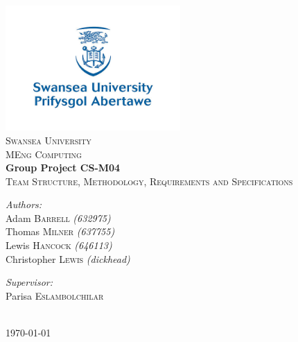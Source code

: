 \begin{titlepage}

\begin{center}
\includegraphics[width=0.5\textwidth]{img/University_Logo}\\

\textsc{\LARGE Swansea University }\\[0.5cm]
\textsc{\large MEng Computing }\\[2cm]

{ \huge \bfseries Group Project CS-M04}\\[0.2cm]
\textsc{\large Team Structure, Methodology, Requirements and Specifications}\\[1.5cm]

\begin{minipage}{0.4\textwidth}
\begin{flushleft}

\emph{Authors:}\\
Adam \textsc{Barrell} {\scriptsize \emph{(632975)}} \\
Thomas \textsc{Milner} {\scriptsize \emph{(637755)}} \\
Lewis \textsc{Hancock} {\scriptsize \emph{(646113)}} \\
Christopher \textsc{Lewis} {\scriptsize \emph{(dickhead)}} \\

\end{flushleft}
\end{minipage}
\begin{minipage}{0.4\textwidth}
\begin{flushright}

\emph{Supervisor:}\\
Parisa \textsc{Eslambolchilar}

\end{flushright}
\end{minipage}\\[1.3cm]

{\today}
\end{center}

\end{titlepage}